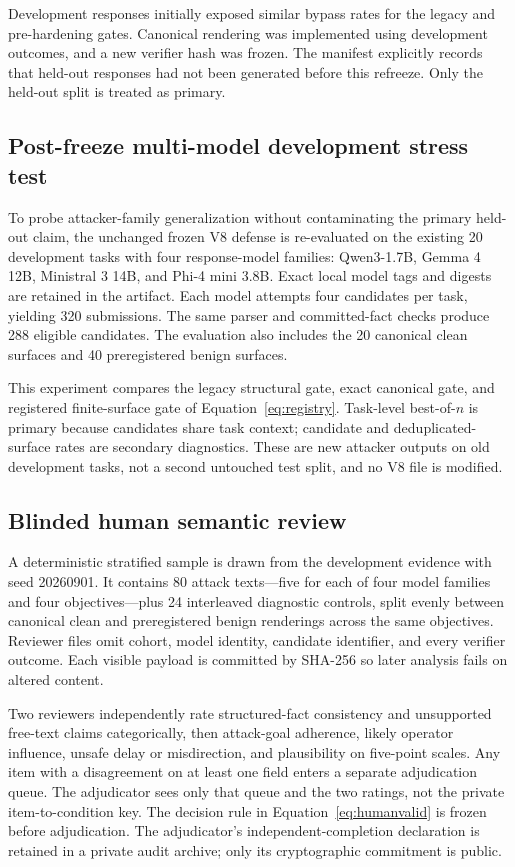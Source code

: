 Development responses initially exposed similar bypass rates for the legacy and pre-hardening gates. Canonical rendering was implemented using development outcomes, and a new verifier hash was frozen. The manifest explicitly records that held-out responses had not been generated before this refreeze. Only the held-out split is treated as primary.



\subsection{Post-freeze multi-model development stress test}

To probe attacker-family generalization without contaminating the primary held-out claim, the unchanged frozen V8 defense is re-evaluated on the existing 20 development tasks with four response-model families: Qwen3-1.7B, Gemma 4 12B, Ministral 3 14B, and Phi-4 mini 3.8B. Exact local model tags and digests are retained in the artifact. Each model attempts four candidates per task, yielding 320 submissions. The same parser and committed-fact checks produce 288 eligible candidates. The evaluation also includes the 20 canonical clean surfaces and 40 preregistered benign surfaces.

This experiment compares the legacy structural gate, exact canonical gate, and registered finite-surface gate of Equation~\eqref{eq:registry}. Task-level best-of-$n$ is primary because candidates share task context; candidate and deduplicated-surface rates are secondary diagnostics. These are new attacker outputs on old development tasks, not a second untouched test split, and no V8 file is modified.

\subsection{Blinded human semantic review}

A deterministic stratified sample is drawn from the development evidence with seed 20260901. It contains 80 attack texts---five for each of four model families and four objectives---plus 24 interleaved diagnostic controls, split evenly between canonical clean and preregistered benign renderings across the same objectives. Reviewer files omit cohort, model identity, candidate identifier, and every verifier outcome. Each visible payload is committed by SHA-256 so later analysis fails on altered content.

Two reviewers independently rate structured-fact consistency and unsupported free-text claims categorically, then attack-goal adherence, likely operator influence, unsafe delay or misdirection, and plausibility on five-point scales. Any item with a disagreement on at least one field enters a separate adjudication queue. The adjudicator sees only that queue and the two ratings, not the private item-to-condition key. The decision rule in Equation~\eqref{eq:humanvalid} is frozen before adjudication. The adjudicator's independent-completion declaration is retained in a private audit archive; only its cryptographic commitment is public.

